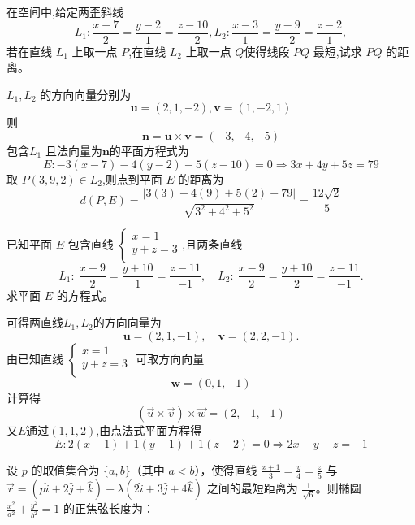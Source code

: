 \begin{questions}
    \question 在空间中,给定两歪斜线  $$L_1:\frac{x-7}{2}=\frac{y-2}{1}=\frac{z-10}{-2},L_2:\frac{x-3}{1}=\frac{y-9}{-2}=\frac{z-2}{1},$$若在直线 $L_1$ 上取一点 $P$,在直线 $L_2$ 上取一点 $Q$使得线段 ${PQ}$ 最短,试求 ${PQ}$ 的距离。
    \begin{solution}
        $L_1,L_2$ 的方向向量分别为
        \[
        \textbf{u} = (2,1,-2) ,\textbf{v} = (1,-2,1)
        \]
        则
        \[
        \textbf{n} = \textbf{u} \times \textbf{v} = (-3,-4,-5)
        \]
        包含$L_1$ 且法向量为$\textbf{n}$的平面方程式为
        \[
        E:-3(x-7) - 4(y-2) - 5(z-10) = 0 \Rightarrow 3x + 4y + 5z = 79
        \]
        取 $P(3,9,2) \in L_2$,则点到平面 $E$ 的距离为
        \[
        d(P, E) = \frac{|3(3) + 4(9) + 5(2) - 79|}{\sqrt{3^2 + 4^2 + 5^2}} = \frac{12\sqrt{2}}{5}
        \]
    \end{solution}

    \question 已知平面 $E$ 包含直线 $\begin{cases} x=1\\ y+z=3\\\end{cases}$,且两条直线
    \[
    L_1:\ \frac{x-9}{2}=\frac{y+10}{1}=\frac{z-11}{-1},\quad
    L_2:\ \frac{x-9}{2}=\frac{y+10}{2}=\frac{z-11}{-1}.
    \]
    求平面 $E$ 的方程式。
    \begin{solution}
        可得两直线$L_1,L_2$的方向向量为
        \[
        \mathbf{u}=(2,1,-1),\quad \mathbf{v}=(2,2,-1).
        \]
        由已知直线 $\begin{cases}x=1\\ y+z=3 \\\end{cases}$ 可取方向向量
        \[
        \mathbf{w}=(0,1,-1)
        \]
        计算得
        \[
        (\vec u\times\vec v)\times\vec w
        =(2, -1, -1 )
        \]
        又$E$通过$(1,1,2)$,由点法式平面方程得
        \[
        E:2(x-1)+1(y-1)+1(z-2)=0 \Rightarrow 2x-y-z=-1
        \]
    \end{solution}
\question
设 $p$ 的取值集合为 $\{a, b\}$（其中 $a < b$），使得直线 $\frac{x+1}{3} = \frac{y}{4} = \frac{z}{5}$ 与 $\vec{r} = (p\hat{i} + 2\hat{j} + \hat{k}) + \lambda(2\hat{i} + 3\hat{j} + 4\hat{k})$ 之间的最短距离为 $\frac{1}{\sqrt{6}}$。则椭圆 $\frac{x^2}{a^2} + \frac{y^2}{b^2} = 1$ 的正焦弦长度为：


\end{questions}
